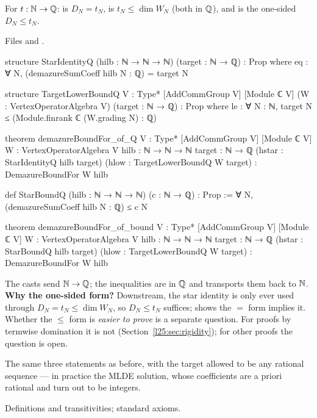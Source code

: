 \begin{definition}\label{l25:def:Qinputs}
For $t:{\mathbb{N}}\to{\mathbb{Q}}$:  is $D_N=t_N$,  is $t_N\le\dim W_N$
(both in ${\mathbb{Q}}$), and  is the one-sided $D_N\le t_N$.
\end{definition}
\noindent Files  and
.
\begin{leancode}
structure StarIdentityQ (hilb : ℕ → ℕ → ℕ) (target : ℕ → ℚ) : Prop where
  eq : ∀ N, (demazureSumCoeff hilb N : ℚ) = target N

structure TargetLowerBoundQ {V : Type*} [AddCommGroup V] [Module ℂ V]
    (W : VertexOperatorAlgebra V) (target : ℕ → ℚ) : Prop where
  le : ∀ N : ℕ, target N ≤ (Module.finrank ℂ (W.grading N) : ℚ)

theorem demazureBoundFor_of_Q {V : Type*} [AddCommGroup V] [Module ℂ V]
    {W : VertexOperatorAlgebra V} {hilb : ℕ → ℕ → ℕ} {target : ℕ → ℚ}
    (hstar : StarIdentityQ hilb target) (hlow : TargetLowerBoundQ W target) :
    DemazureBoundFor W hilb
\end{leancode}
\begin{leancode}
def StarBoundQ (hilb : ℕ → ℕ → ℕ) (c : ℕ → ℚ) : Prop :=
  ∀ N, (demazureSumCoeff hilb N : ℚ) ≤ c N

theorem demazureBoundFor_of_bound {V : Type*} [AddCommGroup V] [Module ℂ V]
    {W : VertexOperatorAlgebra V} {hilb : ℕ → ℕ → ℕ} {target : ℕ → ℚ}
    (hstar : StarBoundQ hilb target) (hlow : TargetLowerBoundQ W target) :
    DemazureBoundFor W hilb
\end{leancode}
\begin{dictionary}
The casts  send ${\mathbb{N}}\to{\mathbb{Q}}$; the inequalities are in ${\mathbb{Q}}$ and  transports them
back to ${\mathbb{N}}$. \textbf{Why the one-sided form?} Downstream, the star identity is only ever used through
$D_N=t_N\le\dim W_N$, so $D_N\le t_N$ suffices;  shows the $=$ form implies
it. Whether the $\le$ form is \emph{easier to prove} is a separate question. For proofs by termwise domination it
is not (Section~\ref{l25:sec:rigidity}); for other proofs the question is open.
\end{dictionary}
\begin{physics}
The same three statements as before, with the target allowed to be any rational sequence --- in practice the
MLDE solution, whose coefficients are a priori rational and turn out to be integers.
\end{physics}
\begin{status}
Definitions and transitivities; standard axioms.
\end{status}

